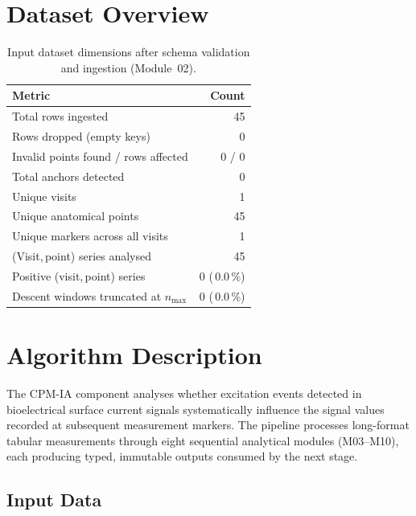 \documentclass[a4paper,11pt]{article}
\begin{document}
\section{Dataset Overview}

\begin{table}[h!]
\centering
\small
\caption{Input dataset dimensions after schema validation and ingestion (Module~02).}
\begin{tabular}{lr}
\toprule
\textbf{Metric} & \textbf{Count} \\
\midrule
Total rows ingested                        & 45 \\
Rows dropped (empty keys)                  & 0 \\
Invalid points found / rows affected       & 0 / 0 \\
Total anchors detected                     & 0 \\
Unique visits                          & 1 \\
Unique anatomical points               & 45 \\
Unique markers across all visits       & 1 \\
(Visit,\,point) series analysed        & 45 \\
Positive (visit,\,point) series        & 0 (\,0.0\,\%) \\
Descent windows truncated at $n_{\max}$ & 0 (\,0.0\,\%) \\
\bottomrule
\end{tabular}
\end{table}

\section{Algorithm Description}

The CPM-IA component analyses whether excitation events detected in bioelectrical surface
current signals systematically influence the signal values recorded at subsequent measurement
markers. The pipeline processes long-format tabular measurements through eight sequential
analytical modules (M03--M10), each producing typed, immutable outputs consumed by the next
stage.

\subsection{Input Data}
\end{document}
